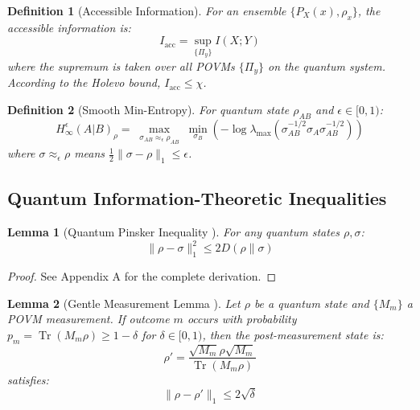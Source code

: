 \documentclass{ieeeaccess}
\newtheorem{lemma}{Lemma}[section]
\newtheorem{definition}{Definition}[section]
\begin{document}
\begin{definition}[Accessible Information]
For an ensemble $\{P_X(x), \rho_x\}$, the accessible information is:
\begin{equation}
    I_{\mathrm{acc}} = \sup_{\{\Pi_y\}} I(X; Y)
\end{equation}
where the supremum is taken over all POVMs $\{\Pi_y\}$ on the quantum system. According to the Holevo bound, $I_{\mathrm{acc}} \leq χ$.
\end{definition}

\begin{definition}[Smooth Min-Entropy]
For quantum state $\rho_{AB}$ and $\epsilon \in [0,1)$:
\begin{equation}
    H_\infty^\epsilon(A|B)_\rho = \max_{\substack{\sigma_{AB} \approx_\epsilon \rho_{AB}}} \min_{\sigma_B} \left( -\log \lambda_{\max}(\sigma_{AB}^{-1/2} \sigma_A \sigma_{AB}^{-1/2}) \right)
\end{equation}
where $\sigma \approx_\epsilon \rho$ means $\frac{1}{2}\|\sigma - \rho\|_1 \leq \epsilon$.
\end{definition}

\subsection{Quantum Information-Theoretic Inequalities}

\begin{lemma}[Quantum Pinsker Inequality {\cite[Theorem 11.9.1]{Wilde2017}}]
For any quantum states $\rho, \sigma$:
\begin{equation}
    \|\rho - \sigma\|_1^2 \leq 2 D(\rho\|\sigma)
\end{equation}
\end{lemma}

\begin{proof}
See Appendix A for the complete derivation.
\end{proof}

\begin{lemma}[Gentle Measurement Lemma {\cite[Lemma 9.4.1]{Wilde2017}}]
Let $\rho$ be a quantum state and $\{M_m\}$ a POVM measurement. If outcome $m$ occurs with probability $p_m = \operatorname{Tr}(M_m \rho) \geq 1 - \delta$ for $\delta \in [0, 1)$, then the post-measurement state is:
\begin{equation}
    \rho' = \frac{\sqrt{M_m}\rho\sqrt{M_m}}{\operatorname{Tr}(M_m\rho)}
\end{equation}
satisfies:
\begin{equation}
    \|\rho - \rho'\|_1 \leq 2\sqrt{\delta}
\end{equation}
\end{lemma}
\end{document}
